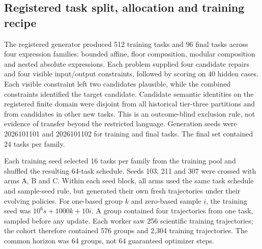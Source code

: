 \documentclass[11pt]{article}
\begin{document}

\subsection{Registered task split, allocation and training recipe}

The registered generator produced 512 training tasks and 96 final tasks across four expression families: bounded affine, floor composition, modular composition and nested absolute expressions. Each problem supplied four candidate repairs and four visible input/output constraints, followed by scoring on 40 hidden cases. Each visible constraint left two candidates plausible, while the combined constraints identified the target candidate. Candidate semantic identities on the registered finite domain were disjoint from all historical tier-three partitions and from candidates in other new tasks. This is an outcome-blind exclusion rule, not evidence of transfer beyond the restricted language. Generation seeds were 2026101101 and 2026101102 for training and final tasks. The final set contained 24 tasks per family.

Each training seed selected 16 tasks per family from the training pool and shuffled the resulting 64-task schedule. Seeds 103, 211 and 307 were crossed with arms A, B and C. Within each seed block, all arms used the same task schedule and sample-seed rule, but generated their own fresh trajectories under their evolving policies. For one-based group $k$ and zero-based sample $i$, the training seed was $10^6s+1000k+10i$. A group contained four trajectories from one task, sampled before any update. Each worker saw 256 scientific training trajectories; the cohort therefore contained 576 groups and 2,304 training trajectories. The common horizon was 64 groups, not 64 guaranteed optimizer steps.
\end{document}
